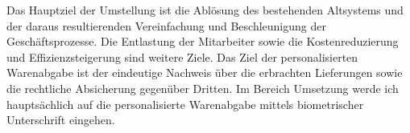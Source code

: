 Das Hauptziel der Umstellung ist die Ablösung des bestehenden Altsystems und der daraus resultierenden Vereinfachung und Beschleunigung der Geschäftsprozesse. Die Entlastung der Mitarbeiter sowie die Kostenreduzierung und Effizienzsteigerung sind weitere Ziele. Das Ziel der personalisierten Warenabgabe ist der eindeutige Nachweis über die erbrachten Lieferungen sowie die rechtliche Absicherung gegenüber Dritten. Im Bereich Umsetzung werde ich hauptsächlich auf die personalisierte Warenabgabe mittels biometrischer Unterschrift eingehen. \cite{einleitung1}
